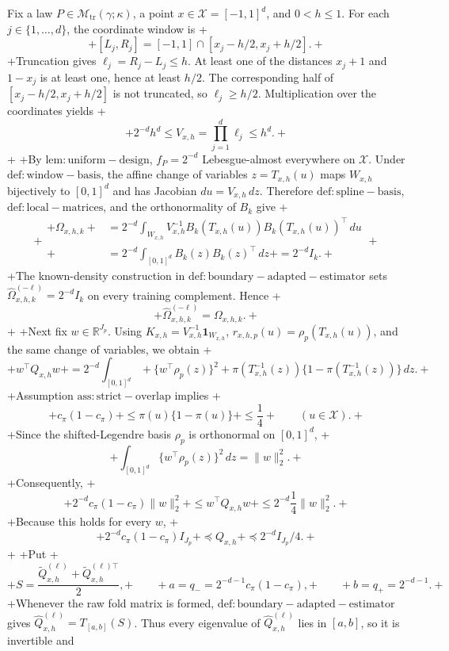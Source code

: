 Fix a law \(P\in\mathcal M_{\mathrm{tr}}(\gamma;\kappa)\), a point \(x\in\mathcal X=[-1,1]^d\), and \(0<h\le 1\). For each \(j\in\{1,\ldots,d\}\), the coordinate window is
+\[
+[L_j,R_j]=[-1,1]\cap[x_j-h/2,x_j+h/2].
+\]
+Truncation gives \(\ell_j=R_j-L_j\le h\). At least one of the distances \(x_j+1\) and \(1-x_j\) is at least one, hence at least \(h/2\). The corresponding half of \([x_j-h/2,x_j+h/2]\) is not truncated, so \(\ell_j\ge h/2\). Multiplication over the coordinates yields
+\[
+2^{-d}h^d\le V_{x,h}=\prod_{j=1}^d\ell_j\le h^d.
+\]
+
+By \(\mathrm{lem:uniform-design}\), \(f_P=2^{-d}\) Lebesgue-almost everywhere on \(\mathcal X\). Under \(\mathrm{def:window-basis}\), the affine change of variables \(z=T_{x,h}(u)\) maps \(W_{x,h}\) bijectively to \([0,1]^d\) and has Jacobian \(du=V_{x,h}\,dz\). Therefore \(\mathrm{def:spline-basis}\), \(\mathrm{def:local-matrices}\), and the orthonormality of \(B_k\) give
+\[
+\begin{aligned}
+\Omega_{x,h,k}
+&=2^{-d}\int_{W_{x,h}}V_{x,h}^{-1}B_k(T_{x,h}(u))B_k(T_{x,h}(u))^\top\,du\\
+&=2^{-d}\int_{[0,1]^d}B_k(z)B_k(z)^\top\,dz
+=2^{-d}I_k.
+\end{aligned}
+\]
+The known-density construction in \(\mathrm{def:boundary-adapted-estimator}\) sets \(\widehat\Omega^{(-\ell)}_{x,h,k}=2^{-d}I_k\) on every training complement. Hence
+\[
+\widehat\Omega^{(-\ell)}_{x,h,k}=\Omega_{x,h,k}.
+\]
+
+Next fix \(w\in\mathbb R^{J_p}\). Using \(K_{x,h}=V_{x,h}^{-1}\mathbf 1_{W_{x,h}}\), \(r_{x,h,p}(u)=\rho_p(T_{x,h}(u))\), and the same change of variables, we obtain
+\[
+w^\top Q_{x,h}w
+=2^{-d}\int_{[0,1]^d}
+\{w^\top\rho_p(z)\}^2
+\pi(T_{x,h}^{-1}(z))\{1-\pi(T_{x,h}^{-1}(z))\}\,dz.
+\]
+Assumption \(\mathrm{ass:strict-overlap}\) implies
+\[
+c_\pi(1-c_\pi)
+\le \pi(u)\{1-\pi(u)\}
+\le \frac14
+\qquad (u\in\mathcal X).
+\]
+Since the shifted-Legendre basis \(\rho_p\) is orthonormal on \([0,1]^d\),
+\[
+\int_{[0,1]^d}\{w^\top\rho_p(z)\}^2\,dz=\lVert w\rVert_2^2.
+\]
+Consequently,
+\[
+2^{-d}c_\pi(1-c_\pi)\lVert w\rVert_2^2
+\le w^\top Q_{x,h}w
+\le 2^{-d}\frac14\lVert w\rVert_2^2.
+\]
+Because this holds for every \(w\),
+\[
+2^{-d}c_\pi(1-c_\pi)I_{J_p}
+\preceq Q_{x,h}
+\preceq 2^{-d}I_{J_p}/4.
+\]
+
+Put
+\[
+S=\frac{\widetilde Q^{(\ell)}_{x,h}+\widetilde Q^{(\ell)\top}_{x,h}}2,
+\qquad
+a=q_-=2^{-d-1}c_\pi(1-c_\pi),
+\qquad
+b=q_+=2^{-d-1}.
+\]
+Whenever the raw fold matrix is formed, \(\mathrm{def:boundary-adapted-estimator}\) gives \(\widehat Q^{(\ell)}_{x,h}=T_{[a,b]}(S)\). Thus every eigenvalue of \(\widehat Q^{(\ell)}_{x,h}\) lies in \([a,b]\), so it is invertible and

